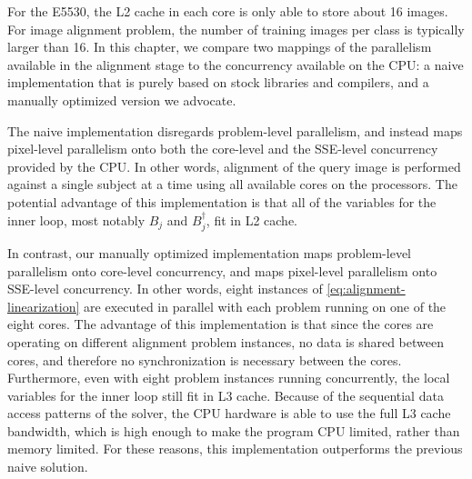 For the E5530, the L2 cache in each core is only able to store about 16 images.
For image alignment problem, the number of training images per class is
typically larger than 16.  
In this chapter, we compare two mappings of the parallelism available in the alignment
stage to the concurrency available on the CPU: a naive implementation that is purely 
based on stock libraries and compilers, and a manually optimized version we advocate.

The naive implementation disregards 
problem-level parallelism, and instead maps pixel-level parallelism
onto both the core-level and the SSE-level concurrency provided by the CPU.  In
other words, alignment of the query image is performed
against a single subject at a time using all available cores on
the processors.  The potential advantage of this implementation is that all of the variables
for the inner loop, most notably $B_j$ and $B_j^\dagger$, fit in L2 cache.  

In contrast, our manually optimized implementation maps problem-level parallelism onto core-level
concurrency, and maps pixel-level parallelism onto SSE-level concurrency.  In
other words, eight instances of \eqref{eq:alignment-linearization} are executed
in parallel with each problem running on one of the eight cores.  The advantage
of this implementation is that since the cores are operating on different
alignment problem instances, no data is shared between cores, and therefore no
synchronization is necessary between the cores.  Furthermore, even with eight
problem instances running concurrently, the local variables for the inner
loop still fit in L3 cache.  Because of the sequential data access patterns of
the solver, the CPU hardware is able to use the full L3 cache bandwidth, which is 
high enough to make the program CPU limited, rather than memory limited.  
For these reasons, this implementation outperforms the previous naive solution.



